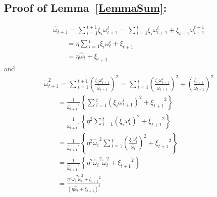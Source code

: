 \documentclass[sigconf]{acmart}
\begin{document}
\subsection{Proof of Lemma~\ref{LemmaSum}:}
\begin{equation*}
\begin{array}{l}
{{\hat \omega }_{t + 1}} = \sum {_{i = 1}^{t + 1}} {\xi _i}\omega _{t + 1}^i = \sum {_{i = 1}^t} {\xi _i}\omega _{t + 1}^i + {\xi _{t + 1}}\omega _{t + 1}^{t + 1}\\
\;\;\;\;\;\;\; = \eta \sum {_{i = 1}^t} {\xi _i}\omega _t^i + {\xi _{t + 1}}\\
\;\;\;\;\;\;\; = \eta {{\hat \omega }_t} + {\xi _{t + 1}}
\end{array}
\end{equation*}
and
\begin{equation*}
\begin{array}{l}
\tilde \omega _{t + 1}^2 = \sum {_{i = 1}^{t + 1}} {\left( {\frac{{{\xi _i}\omega _{t + 1}^i}}{{{{\hat \omega }_{t + 1}}}}} \right)^2} = \sum {_{i = 1}^t} {\left( {\frac{{{\xi _i}\omega _{t + 1}^i}}{{{{\hat \omega }_{t + 1}}}}} \right)^2} + {\left( {\frac{{{\xi _{t + 1}}}}{{{{\hat \omega }_{t + 1}}}}} \right)^2}\\
\;\;\;\;\;\;\; = \frac{1}{{{{\hat \omega }_{t + 1}}^2}}\left\{ {\sum {_{i = 1}^t} {{\left( {{\xi _i}\omega _{t + 1}^i} \right)}^2} + {\xi _{t + 1}}^2} \right\}\\
\;\;\;\;\;\;\; = \frac{1}{{{{\hat \omega }_{t + 1}}^2}}\left\{ {{\eta ^2}\sum {_{i = 1}^t} {{\left( {{\xi _i}\omega _t^i} \right)}^2} + {\xi _{t + 1}}^2} \right\}\\
\;\;\;\;\;\;\; = \frac{1}{{{{\hat \omega }_{t + 1}}^2}}\left\{ {{\eta ^2}{{\hat \omega }_t}^2\sum {_{i = 1}^t} {{\left( {\frac{{{\xi _i}\omega _t^i}}{{{{\hat \omega }_t}}}} \right)}^2} + {\xi _{t + 1}}^2} \right\}\\
\;\;\;\;\;\;\; = \frac{1}{{{{\hat \omega }_{t + 1}}^2}}\left\{ {{\eta ^2}{{\hat \omega }_t}^2\tilde \omega _t^2 + {\xi _{t + 1}}^2} \right\}\\
\;\;\;\;\;\;\; = \frac{{{\eta ^2}{{\hat \omega }_t}^2\tilde \omega _t^2 + {\xi _{t + 1}}^2}}{{{{\left( {\eta {{\hat \omega }_t} + {\xi _{t + 1}}} \right)}^2}}}
\end{array}
\end{equation*}
\end{document}
